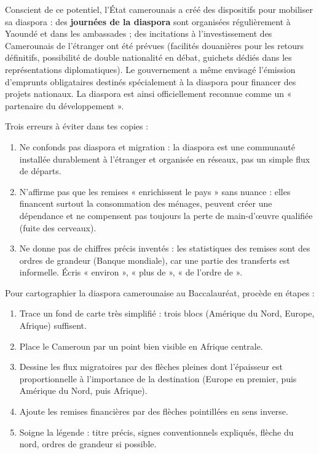 \documentclass[11pt]{article}
\newcommand{\cle}[1]{{\popxbold\color{popdark}#1}}
\begin{document}
\begin{savaistu}
Conscient de ce potentiel, l'État camerounais a créé des dispositifs pour mobiliser sa diaspora : des \textbf{journées de la diaspora} sont organisées régulièrement à Yaoundé et dans les ambassades ; des incitations à l'investissement des Camerounais de l'étranger ont été prévues (facilités douanières pour les retours définitifs, possibilité de double nationalité en débat, guichets dédiés dans les représentations diplomatiques). Le gouvernement a même envisagé l'émission d'emprunts obligataires destinés spécialement à la diaspora pour financer des projets nationaux. La diaspora est ainsi officiellement reconnue comme un « partenaire du développement ».
\end{savaistu}

\begin{attention}
Trois erreurs à éviter dans tes copies :
\begin{enumerate}
\item Ne confonds pas \cle{diaspora} et \cle{migration} : la diaspora est une communauté installée durablement à l'étranger et organisée en réseaux, pas un simple flux de départs.
\item N'affirme pas que les remises « enrichissent le pays » sans nuance : elles financent surtout la consommation des ménages, peuvent créer une dépendance et ne compensent pas toujours la perte de main-d'œuvre qualifiée (fuite des cerveaux).
\item Ne donne pas de chiffres précis inventés : les statistiques des remises sont des ordres de grandeur (Banque mondiale), car une partie des transferts est informelle. Écris « environ », « plus de », « de l'ordre de ».
\end{enumerate}
\end{attention}

\begin{methode}
Pour cartographier la diaspora camerounaise au Baccalauréat, procède en étapes :
\begin{enumerate}
\item Trace un fond de carte très simplifié : trois blocs (Amérique du Nord, Europe, Afrique) suffisent.
\item Place le Cameroun par un point bien visible en Afrique centrale.
\item Dessine les flux migratoires par des flèches pleines dont l'épaisseur est proportionnelle à l'importance de la destination (Europe en premier, puis Amérique du Nord, puis Afrique).
\item Ajoute les remises financières par des flèches pointillées en sens inverse.
\item Soigne la légende : titre précis, signes conventionnels expliqués, flèche du nord, ordres de grandeur si possible.
\end{enumerate}
\end{methode}
\end{document}
